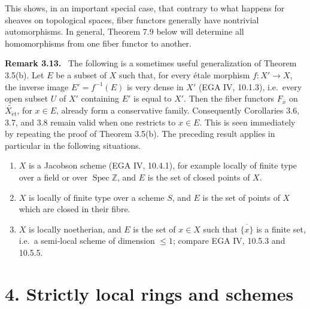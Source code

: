 \documentclass[11pt]{article}
\newcommand{\Spec}{\operatorname{Spec}}
\newcommand{\et}{\mathrm{\acute{e}t}}
\newcommand{\ie}{i.e.\ }
\newcommand{\EGA}{EGA}
\newenvironment{remarktext}[1]{\par\medskip\noindent\textbf{#1.}\ }{\par\medskip}
\begin{document}
This shows, in an important special case, that contrary to what happens for sheaves on topological spaces, fiber functors generally have nontrivial automorphisms. In general, Theorem 7.9 below will determine all homomorphisms from one fiber functor to another.

\begin{remarktext}{Remark 3.13}
The following is a sometimes useful generalization of Theorem 3.5(b). Let \(E\) be a subset of \(X\) such that, for every \'etale morphism \(f:X'\to X\), the inverse image \(E'=f^{-1}(E)\) is very dense in \(X'\) (\EGA{} IV, 10.1.3), \ie every open subset \(U\) of \(X'\) containing \(E'\) is equal to \(X'\). Then the fiber functors \(F_{\bar x}\) on \(\widetilde{X_{\et}}\), for \(x\in E\), already form a conservative family. Consequently Corollaries 3.6, 3.7, and 3.8 remain valid when one restricts to \(x\in E\). This is seen immediately by repeating the proof of Theorem 3.5(b). The preceding result applies in particular in the following situations.
\begin{enumerate}[label=\alph*)]
\item \(X\) is a Jacobson scheme (\EGA{} IV, 10.4.1), for example locally of finite type over a field or over \(\Spec\mathbb Z\), and \(E\) is the set of closed points of \(X\).
\item \(X\) is locally of finite type over a scheme \(S\), and \(E\) is the set of points of \(X\) which are closed in their fibre.
\item \(X\) is locally noetherian, and \(E\) is the set of \(x\in X\) such that \(\overline{\{x\}}\) is a finite set, \ie a semi-local scheme of dimension \(\leq 1\); compare \EGA{} IV, 10.5.3 and 10.5.5.
\end{enumerate}
\end{remarktext}

\section*{4. Strictly local rings and schemes}
\end{document}
